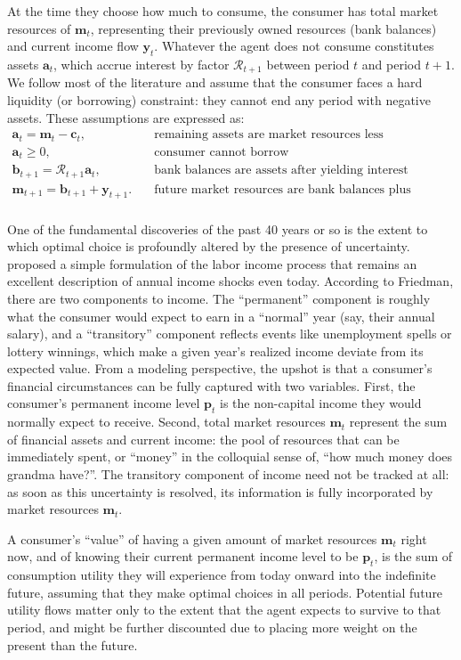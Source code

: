 \documentclass{article}
\newcommand{\cLvl}{\mathbf{c}}
\newcommand{\mLvl}{\mathbf{m}}
\newcommand{\yLvl}{\mathbf{y}}
\newcommand{\aLvl}{\mathbf{a}}
\newcommand{\Rport}{\mathcal{R}}
\newcommand{\bLvl}{\mathbf{b}}
\newcommand{\pLvl}{\mathbf{p}}
\begin{document}
At the time they choose how much to consume, the consumer has total market resources of $\mLvl_t$, representing their previously owned resources (bank balances) and current income flow $\yLvl_t$.
Whatever the agent does not consume constitutes assets $\aLvl_t$, which accrue interest by factor $\Rport_{t+1}$ between period $t$ and period $t+1$.
We follow most of the literature and assume that the consumer faces a hard liquidity (or borrowing) constraint: they cannot end any period with negative assets.
These assumptions are expressed as:
\begin{align}
    \aLvl_t = \mLvl_t - \cLvl_t, & \text{~~~remaining assets are market resources less consumption} \\
    \aLvl_t \geq 0, & \text{~~~consumer cannot borrow} \\
    \bLvl_{t+1} = \Rport_{t+1} \aLvl_t, & \text{~~~bank balances are assets after yielding interest} \\
    \mLvl_{t+1} = \bLvl_{t+1} + \yLvl_{t+1}. & \text{~~~future market resources are bank balances plus income} \\
\end{align}

One of the fundamental discoveries of the past 40 years or so is the extent to which optimal choice is profoundly altered by the presence of uncertainty.
\cite{friedman1957} proposed a simple formulation of the labor income process that remains an excellent description of annual income shocks even today.  According to Friedman, there are two components to income.
The ``permanent'' component is roughly what the consumer would expect to earn in a ``normal'' year (say, their annual salary), and a ``transitory'' component reflects events like unemployment spells or lottery winnings, which make a given year's realized income deviate from its expected value.
From a modeling perspective, the upshot is that a consumer's financial circumstances can be fully captured with two variables.
First, the consumer's permanent income level $\pLvl_{t}$ is the non-capital income they would normally expect to receive.
Second, total market resources $\mLvl_{t}$ represent the sum of financial assets and current income: the pool of resources that can be immediately spent, or ``money'' in the colloquial sense of, ``how much money does grandma have?''.
The transitory component of income need not be tracked at all: as soon as this uncertainty is resolved, its information is fully incorporated by market resources $\mLvl_{t}$.

A consumer's ``value'' of having a given amount of market resources $\mLvl_{t}$ right now, and of knowing their current permanent income level to be $\pLvl_{t}$, is the sum of consumption utility they will experience from today onward into the indefinite future, assuming that they make optimal choices in all periods.
Potential future utility flows matter only to the extent that the agent expects to survive to that period, and might be further discounted due to placing more weight on the present than the future.
\end{document}
